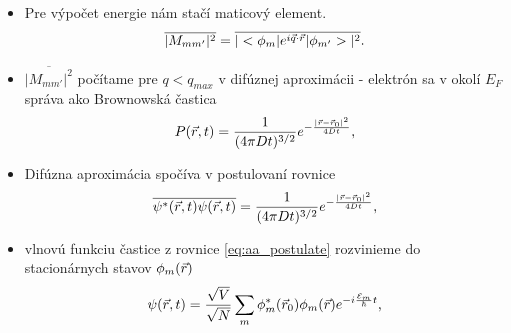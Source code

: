 \documentclass[
	11pt, %
]{beamer}
\begin{document}
\begin{frame}
\begin{itemize}
\item Pre výpočet energie nám stačí maticový element.
\begin{equation}
\label{eq:aa_matrix_element}
\overline{| M_{mm'}|^2} =\overline{|<\phi_m|e^{i\vec{q}\cdot\vec{r}}|\phi_{m'}>|^2} \text{.}
\end{equation}
\item $\overline{| M_{mm'}|^2}$ počítame pre $q<q_{max}$ v difúznej aproximácii - elektrón sa v okolí $E_F$ správa ako
Brownowská častica
\begin{equation}
 \label{eq:diffusion}
 P(\vec{r},t)=\frac{1}{(4\pi Dt)^{3/2}}e^{-\frac{|\vec{r}-\vec{r}_0|^2}{4Dt}} \text{,}
\end{equation}
\item Difúzna aproximácia spočíva v postulovaní rovnice
\begin{equation}
 \label{eq:aa_postulate}
 \overline{\psi^*(\vec{r},t)\psi(\vec{r},t)}=\frac{1}{(4\pi Dt)^{3/2}}e^{-\frac{|\vec{r}-\vec{r}_0|^2}{4Dt}} \text{,}
\end{equation}
\item vlnovú funkciu častice z rovnice \eqref{eq:aa_postulate} rozvinieme do stacionárnych stavov $\phi_m(\vec{r})$
\begin{equation}
 \label{eq:aa_psi_sum}
 \psi(\vec{r},t)=\frac{\sqrt{V}}{\sqrt{N}}\sum_m \phi_m^*(\vec{r}_0)\phi_m(\vec{r})e^{-i\frac{\mathcal{E}_m}{\hbar}t} \text{,}
\end{equation}
\end{itemize}
\end{frame}
\end{document}

